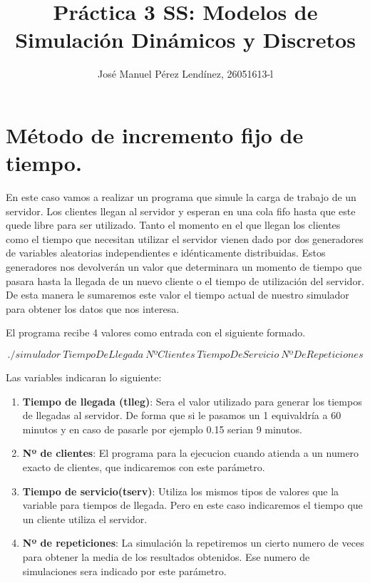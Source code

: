 \documentclass[]{article}
\title{Práctica 3 SS: Modelos de Simulación Dinámicos y Discretos}
\author{José Manuel Pérez Lendínez, 26051613-l}
\begin{document}
	\maketitle
	
	
	\newpage
	\tableofcontents
	\newpage
	
\section{Método de incremento fijo de tiempo.}
En este caso vamos a realizar un programa que simule la carga de trabajo de un servidor. Los clientes llegan al servidor y esperan en una cola fifo hasta que este quede libre para ser utilizado. Tanto el momento en el que llegan los clientes como el tiempo que necesitan utilizar el servidor vienen dado por dos generadores de variables aleatorias independientes e idénticamente distribuidas. Estos generadores nos devolverán un valor que determinara un momento de tiempo que pasara hasta la llegada de un nuevo cliente o el tiempo de utilización del servidor. De esta manera le sumaremos este valor el tiempo actual de nuestro simulador para obtener los datos que nos interesa. 

El programa recibe 4 valores como entrada con el siguiente formado.

$$./simulador\ TiempoDeLlegada\ NºClientes\ TiempoDeServicio\ NºDeRepeticiones$$


Las variables indicaran lo siguiente:
	\begin{enumerate}
		\item \textbf{Tiempo de llegada (tlleg)}: Sera el valor utilizado para generar los tiempos de llegadas al servidor. De forma que si le pasamos un 1 equivaldría a 60 minutos y en caso de pasarle por ejemplo 0.15 serian 9 minutos.
		\item \textbf{Nº de clientes}: El programa para la ejecucion cuando atienda a un numero exacto de clientes, que indicaremos con este parámetro.
		\item \textbf{Tiempo de servicio(tserv)}: Utiliza los mismos tipos de valores que la variable para tiempos de llegada. Pero en este caso indicaremos el tiempo que un cliente utiliza el servidor.
		\item \textbf{Nº de repeticiones}: La simulación la repetiremos un cierto numero de veces para obtener la media de los resultados obtenidos. Ese numero de simulaciones sera indicado por este parámetro.
	\end{enumerate}
\end{document}
